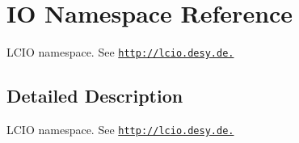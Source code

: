 \hypertarget{namespace_i_o}{
\section{IO Namespace Reference}
\label{namespace_i_o}
}


LCIO namespace. See \href{http://lcio.desy.de.}{\tt http://lcio.desy.de.}  


\subsection{Detailed Description}
LCIO namespace. See \href{http://lcio.desy.de.}{\tt http://lcio.desy.de.} 
